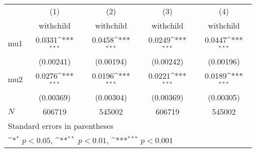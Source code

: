 {
\def\sym#1{\ifmmode^{#1}\else\(^{#1}\)\fi}
\begin{tabular}{l*{4}{c}}
\toprule
            &\multicolumn{1}{c}{(1)}&\multicolumn{1}{c}{(2)}&\multicolumn{1}{c}{(3)}&\multicolumn{1}{c}{(4)}\\
            &\multicolumn{1}{c}{withchild}&\multicolumn{1}{c}{withchild}&\multicolumn{1}{c}{withchild}&\multicolumn{1}{c}{withchild}\\
\midrule
mu1         &      0.0331\sym{***}&      0.0458\sym{***}&      0.0249\sym{***}&      0.0447\sym{***}\\
            &   (0.00241)         &   (0.00194)         &   (0.00242)         &   (0.00196)         \\
\addlinespace
mu2         &      0.0276\sym{***}&      0.0196\sym{***}&      0.0221\sym{***}&      0.0189\sym{***}\\
            &   (0.00369)         &   (0.00304)         &   (0.00369)         &   (0.00305)         \\
\midrule
\(N\)       &      606719         &      545002         &      606719         &      545002         \\
\bottomrule
\multicolumn{5}{l}{\footnotesize Standard errors in parentheses}\\
\multicolumn{5}{l}{\footnotesize \sym{*} \(p<0.05\), \sym{**} \(p<0.01\), \sym{***} \(p<0.001\)}\\
\end{tabular}
}
